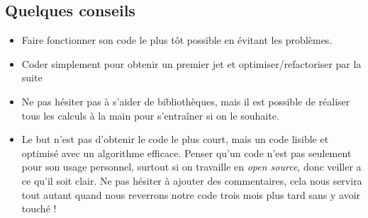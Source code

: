 \subsection*{Quelques conseils}
\begin{itemize}
	\item[\textbullet] Faire fonctionner son code le plus tôt possible en évitant les problèmes.
	\item[\textbullet] Coder simplement pour obtenir un premier jet et optimiser/refactoriser par la suite
	\item[\textbullet] Ne pas hésiter pas à s'aider de bibliothèques, mais il est possible de réaliser tous les calculs à la main pour s'entraîner si on le souhaite.
	\item[\textbullet] Le but n'est pas d'obtenir le code le plus court, mais un code lisible et optimisé avec un algorithme efficace. Penser qu'un code n'est pas seulement pour son usage personnel, surtout si on travaille en \textit{open source}, donc veiller a ce qu'il soit clair. Ne pas hésiter à ajouter des commentaires, cela nous servira tout autant quand nous reverrons notre code trois mois plus tard sans y avoir touché !
\end{itemize}
\medskip
